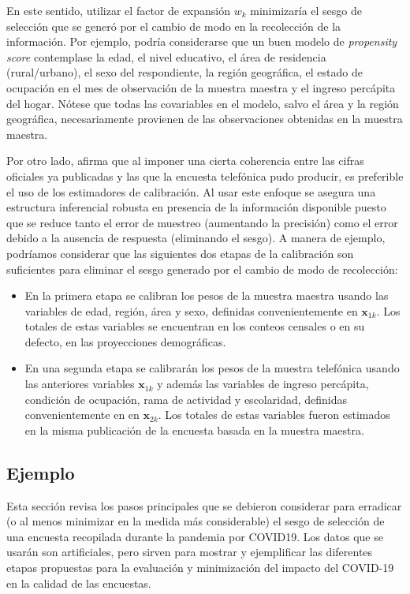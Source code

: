 \documentclass[
  12pt,
]{book}
\providecommand{\tightlist}{%
  \setlength{\itemsep}{0pt}\setlength{\parskip}{0pt}}
\begin{document}
En este sentido, utilizar el factor de expansión \(w_k\) minimizaría el sesgo de selección que se generó por el cambio de modo en la recolección de la información. Por ejemplo, podría considerarse que un buen modelo de \emph{propensity score} contemplase la edad, el nivel educativo, el área de residencia (rural/urbano), el sexo del respondiente, la región geográfica, el estado de ocupación en el mes de observación de la muestra maestra y el ingreso percápita del hogar. Nótese que todas las covariables en el modelo, salvo el área y la región geográfica, necesariamente provienen de las observaciones obtenidas en la muestra maestra.

Por otro lado, \citet{CEPAL_publica} afirma que al imponer una cierta coherencia entre las cifras oficiales ya publicadas y las que la encuesta telefónica pudo producir, es preferible el uso de los estimadores de calibración. Al usar este enfoque se asegura una estructura inferencial robusta en presencia de la información disponible puesto que se reduce tanto el error de muestreo (aumentando la precisión) como el error debido a la ausencia de respuesta (eliminando el sesgo). A manera de ejemplo, podríamos considerar que las siguientes dos etapas de la calibración son suficientes para eliminar el sesgo generado por el cambio de modo de recolección:

\begin{itemize}
\tightlist
\item
  En la primera etapa se calibran los pesos de la muestra maestra usando las variables de edad, región, área y sexo, definidas convenientemente en \(\boldsymbol{x}_{1k}\). Los totales de estas variables se encuentran en los conteos censales o en su defecto, en las proyecciones demográficas.
\item
  En una segunda etapa se calibrarán los pesos de la muestra telefónica usando las anteriores variables \(\boldsymbol{x}_{1k}\) y además las variables de ingreso percápita, condición de ocupación, rama de actividad y escolaridad, definidas convenientemente en en \(\boldsymbol{x}_{2k}\). Los totales de estas variables fueron estimados en la misma publicación de la encuesta basada en la muestra maestra.
\end{itemize}

\hypertarget{ejemplo}{%
\subsection{Ejemplo}\label{ejemplo}}

Esta sección revisa los pasos principales que se debieron considerar para erradicar (o al menos minimizar en la medida más considerable) el sesgo de selección de una encuesta recopilada durante la pandemia por COVID19. Los datos que se usarán son artificiales, pero sirven para mostrar y ejemplificar las diferentes etapas propuestas para la evaluación y minimización del impacto del COVID-19 en la calidad de las encuestas.
\end{document}
